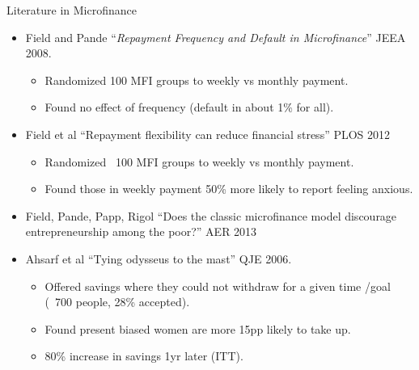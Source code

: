 \documentclass[9pt]{beamer}
\begin{document}
\begin{frame}{Literature in Microfinance}

        \begin{itemize}
        \vfill \item Field and Pande ``\textit{Repayment Frequency and Default in Microfinance}'' JEEA 2008.
            \begin{itemize}
            \item Randomized 100 MFI groups to weekly vs monthly payment.
            \item Found no effect of frequency (default in about 1\% for all).
            \end{itemize}
            \pause
        \vfill \item Field et al ``Repayment flexibility can reduce financial stress'' PLOS 2012
            \begin{itemize}
            \item Randomized ~100 MFI groups to weekly vs monthly payment.
            \item Found those in weekly payment  50\% more likely to report feeling anxious.
            \end{itemize}
            \pause
        \vfill \item Field, Pande, Papp, Rigol ``Does the classic microfinance model discourage entrepreneurship among the poor?'' AER 2013
        \pause
        \vfill \item Ahsarf et al ``Tying odysseus to the mast'' QJE 2006.
               \begin{itemize}
                \item Offered savings where they could not withdraw for a given time /goal (~700 people, 28\% accepted).
                \item Found present biased women  are more 15pp likely to take up.
                \item 80\% increase in savings 1yr later (ITT).
             \end{itemize}
             \vfill

    \end{itemize}

\end{frame}



	
\end{document}
